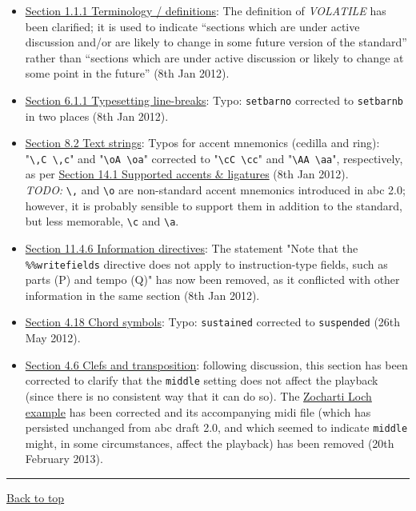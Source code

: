 \begin{itemize}
\item
  \protect\hyperlink{terminology_definitions}{Section 1.1.1 Terminology
  / definitions}: The definition of \emph{VOLATILE} has been clarified;
  it is used to indicate ``sections which are under active discussion
  and/or are likely to change in some future version of the standard''
  rather than ``sections which are under active discussion or likely to
  change at some point in the future'' (8th Jan 2012).
\item
  \protect\hyperlink{typesetting_line-breaks}{Section 6.1.1 Typesetting
  line-breaks}: Typo: \texttt{setbarno} corrected to \texttt{setbarnb}
  in two places (8th Jan 2012).
\item
  \protect\hyperlink{text_strings}{Section 8.2 Text strings}: Typos for
  accent mnemonics (cedilla and ring):
  "\texttt{\textbackslash{},C\ \textbackslash{},c}" and
  "\texttt{\textbackslash{}oA\ \textbackslash{}oa}" corrected to
  "\texttt{\textbackslash{}cC\ \textbackslash{}cc}" and
  "\texttt{\textbackslash{}AA\ \textbackslash{}aa}", respectively, as
  per \protect\hyperlink{supported_accents_ligatures}{Section 14.1
  Supported accents \& ligatures} (8th Jan 2012).\\
  \emph{TODO:} \texttt{\textbackslash{},} and \texttt{\textbackslash{}o}
  are non-standard accent mnemonics introduced in abc 2.0; however, it
  is probably sensible to support them in addition to the standard, but
  less memorable, \texttt{\textbackslash{}c} and
  \texttt{\textbackslash{}a}.
\item
  \protect\hyperlink{information_directives}{Section 11.4.6 Information
  directives}: The statement "Note that the \texttt{\%\%writefields}
  directive does not apply to instruction-type fields, such as parts (P)
  and tempo (Q)" has now been removed, as it conflicted with other
  information in the same section (8th Jan 2012).
\item
  \protect\hyperlink{chord_symbols}{Section 4.18 Chord symbols}: Typo:
  \texttt{sustained} corrected to \texttt{suspended} (26th May 2012).
\item
  \protect\hyperlink{clefs_and_transposition}{Section 4.6 Clefs and
  transposition}: following discussion, this section has been corrected
  to clarify that the \texttt{middle} setting does not affect the
  playback (since there is no consistent way that it can do so). The
  \protect\hyperlink{multiple_voices}{Zocharti Loch example} has been
  corrected and its accompanying midi file (which has persisted
  unchanged from abc draft 2.0, and which seemed to indicate
  \texttt{middle} might, in some circumstances, affect the playback) has
  been removed (20th February 2013).
\end{itemize}

\begin{center}\rule{0.5\linewidth}{\linethickness}\end{center}

\protect\hyperlink{}{Back to top}
